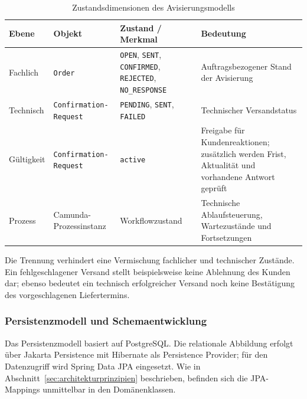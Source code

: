 \begin{table}[htbp]
  \centering
  \caption{Zustandsdimensionen des Avisierungsmodells}
  \label{tab:zustandsdimensionen}
  \small
  \setlength{\tabcolsep}{4pt}
  \begin{tabularx}{\textwidth}{@{}>{\raggedright\arraybackslash}p{}>{\raggedright\arraybackslash}p{}>{\raggedright\arraybackslash}p{}>{\raggedright\arraybackslash}X@{}}
    \toprule
    Ebene & Objekt & Zustand / Merkmal & Bedeutung \\
    \midrule
    Fachlich & \texttt{Order}
      & \texttt{OPEN}, \texttt{SENT}, \texttt{CONFIRMED}, \texttt{REJECTED}, \texttt{NO\_RESPONSE}
      & Auftragsbezogener Stand der Avisierung \\
    Technisch & \texttt{Confirmation-}\newline\texttt{Request}
      & \texttt{PENDING}, \texttt{SENT}, \texttt{FAILED}
      & Technischer Versandstatus \\
    Gültigkeit & \texttt{Confirmation-}\newline\texttt{Request}
      & \texttt{active}
      & Freigabe für Kundenreaktionen; zusätzlich werden Frist, Aktualität und vorhandene Antwort geprüft \\
    Prozess & Camunda-Prozessinstanz
      & Workflowzustand
      & Technische Ablaufsteuerung, Wartezustände und Fortsetzungen \\
    \bottomrule
  \end{tabularx}
\end{table}

Die Trennung verhindert eine Vermischung fachlicher und technischer Zustände.
Ein fehlgeschlagener Versand stellt beispielsweise keine Ablehnung des Kunden
dar; ebenso bedeutet ein technisch erfolgreicher Versand noch keine
Bestätigung des vorgeschlagenen Liefertermins.

\subsubsection{Persistenzmodell und Schemaentwicklung}
\label{sec:persistenzmodell}

Das Persistenzmodell basiert auf PostgreSQL. Die relationale Abbildung erfolgt
über Jakarta Persistence mit Hibernate als Persistence Provider; für den
Datenzugriff wird Spring Data JPA eingesetzt. Wie in
Abschnitt~\ref{sec:architekturprinzipien} beschrieben, befinden sich die
JPA-Mappings unmittelbar in den Domänenklassen.

